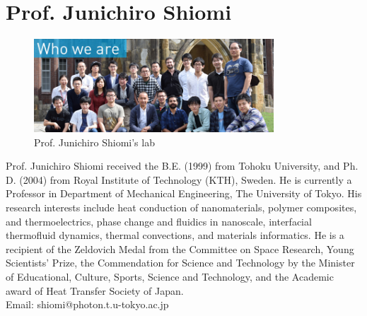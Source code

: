 \section*{Prof. Junichiro Shiomi}
\begin{figure}[htbp!] 
\centering    
\includegraphics[width=0.8\textwidth]{shiomi.png}
\caption[Prof. Junichiro Shiomi]{Prof. Junichiro Shiomi's lab}
\end{figure}
 Prof. Junichiro Shiomi received the B.E. (1999) from Tohoku University, and Ph. D. (2004) from Royal Institute of Technology (KTH), Sweden. He is currently a Professor in Department of Mechanical Engineering, The University of Tokyo. His research interests include heat conduction of nanomaterials, polymer composites, and thermoelectrics, phase change and fluidics in nanoscale, interfacial thermofluid dynamics, thermal convections, and materials informatics. He is a recipient of the Zeldovich Medal from the Committee on Space Research, Young Scientists' Prize, the Commendation for Science and Technology by the Minister of Educational, Culture, Sports, Science and Technology, and the Academic award of Heat Transfer Society of Japan. \\ 
Email: shiomi@photon.t.u-tokyo.ac.jp

